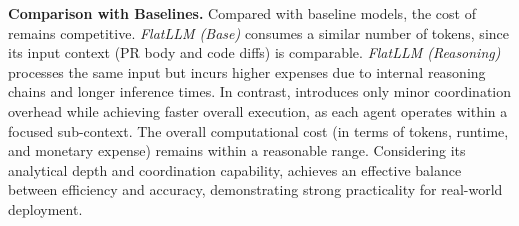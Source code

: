 \begin{table}[ht]
\centering
\small

\setlength{\tabcolsep}{3pt}
\caption{Computation cost and runtime of \appname across different task types. Tokens include both input and output.}
\label{tab:cost}
\vspace{-0.4cm}
\end{table}


\noindent\textbf{Comparison with Baselines.}
Compared with baseline models, the cost of \appname remains competitive.
\textit{FlatLLM (Base)} consumes a similar number of tokens, since its input context (PR body and code diffs) is comparable.
\textit{FlatLLM (Reasoning)} processes the same input but incurs higher expenses due to internal reasoning chains and longer inference times.
In contrast, \appname introduces only minor coordination overhead while achieving faster overall execution, as each agent operates within a focused sub-context.
The overall computational cost (in terms of tokens, runtime, and monetary expense) remains within a reasonable range.
Considering its analytical depth and coordination capability, \appname achieves an effective balance between efficiency and accuracy, demonstrating strong practicality for real-world deployment.